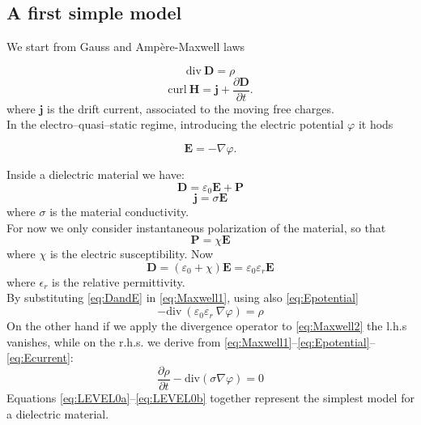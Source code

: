 \documentclass[11pt,a4paper]{article}
\begin{document}
\subsection{A first simple model}
We start from Gauss and Ampère-Maxwell laws

\begin{equation}
	\mathrm{div}\  \mathbf{D}  = \rho 
	\label{eq:Maxwell1}
\end{equation}
\begin{equation}
	\mathrm{curl}\ \mathbf{H} = \mathbf{j} + \dfrac{\partial \mathbf{D}}{\partial t}.
	\label{eq:Maxwell2}
\end{equation}
where \(\mathbf{j}\) is the drift current, associated to the moving free charges.\\
In the electro--quasi--static regime, introducing the electric potential \(\varphi\) it hods

\begin{equation} 
	\mathbf{E} = - \nabla \varphi.
	\label{eq:Epotential}
\end{equation}

Inside a dielectric material we have:
\begin{equation}
	\mathbf{D} = \varepsilon_{0} \mathbf{E} + \mathbf{P}
	\label{eq:D_composition}
\end{equation}
\begin{equation}
	\mathbf{j} = \sigma \mathbf{E}
	\label{eq:Ecurrent}
\end{equation}
where \(\sigma\) is the material conductivity.\\
For now we only consider instantaneous polarization of the material, so that 
\begin{equation}
	\mathbf{P} = \chi \mathbf{E}
\end{equation}
where \(\chi\) is the electric susceptibility. Now
\begin{equation}
	\mathbf{D} = \left( \varepsilon_0+\chi\right)\mathbf{E} = \varepsilon_0\varepsilon_r\mathbf{E}
	\label{eq:DandE}
\end{equation}
where \(\epsilon_r\) is the relative permittivity.\\
By substituting \eqref{eq:DandE} in \eqref{eq:Maxwell1}, using also \eqref{eq:Epotential}
\begin{equation}\label{eq:LEVEL0a}
	- \mathrm{div}\ \left( \varepsilon_{0} \varepsilon_{r}\ \nabla \varphi
	\right)  = \rho
\end{equation}
On the other hand if we apply the divergence operator to \eqref{eq:Maxwell2} the l.h.s vanishes, while on the r.h.s. we derive from \eqref{eq:Maxwell1}--\eqref{eq:Epotential}--\eqref{eq:Ecurrent}:
\begin{equation}\label{eq:LEVEL0b}
	\dfrac{\partial \rho}{\partial t} - \mathrm{div} \left(  \sigma \nabla \varphi\right) = 0
\end{equation}
Equations \eqref{eq:LEVEL0a}--\eqref{eq:LEVEL0b} together represent the simplest model for a dielectric material.
\end{document}
